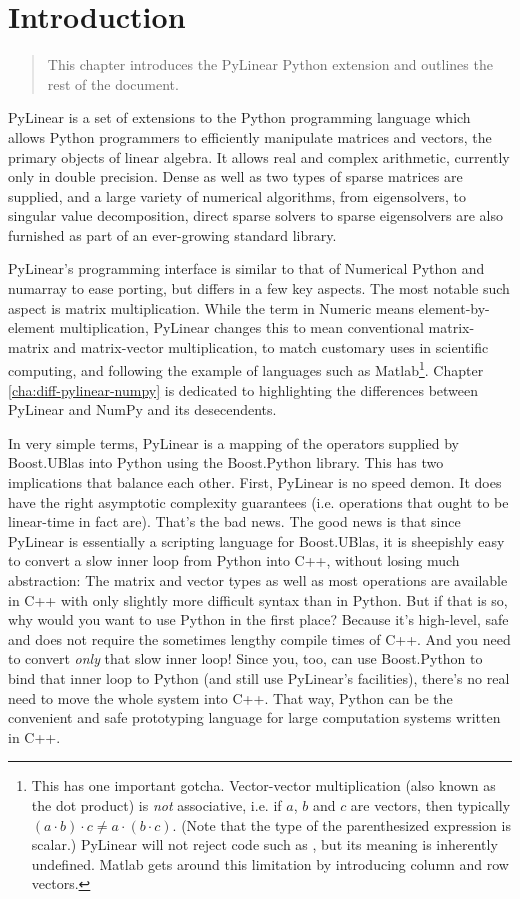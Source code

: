 \chapter{Introduction}
\label{cha:introduction}

\begin{quote}
   This chapter introduces the PyLinear Python extension and outlines the rest
   of the document.
\end{quote}

PyLinear is a set of extensions to the Python programming language
which allows Python programmers to efficiently manipulate matrices and
vectors, the primary objects of linear algebra.  It allows real and
complex arithmetic, currently only in double precision.  Dense as well
as two types of sparse matrices are supplied, and a large variety of
numerical algorithms, from eigensolvers, to singular value
decomposition, direct sparse solvers to sparse eigensolvers are also
furnished as part of an ever-growing standard library.

PyLinear's programming interface is similar to that of Numerical
Python and numarray to ease porting, but differs in a few key
aspects. The most notable such aspect is matrix multiplication. While
the term  in Numeric means element-by-element
multiplication, PyLinear changes this to mean conventional
matrix-matrix and matrix-vector multiplication, to match customary
uses in scientific computing, and following the example of languages
such as Matlab\footnote{This has one important gotcha. Vector-vector
multiplication (also known as the dot product) is \emph{not}
associative, i.e. if $a$, $b$ and $c$ are vectors, then typically
$(a\cdot b)\cdot c\not=a\cdot(b\cdot c)$. (Note that the type of the
parenthesized expression is scalar.) PyLinear will not reject code
such as , but its meaning is inherently undefined. Matlab
gets around this limitation by introducing column and row vectors.}.
Chapter \ref{cha:diff-pylinear-numpy} is dedicated to highlighting the
differences between PyLinear and NumPy and its desecendents.

In very simple terms, PyLinear is a mapping of the operators supplied by
Boost.UBlas into Python using the Boost.Python library.  This has two
implications that balance each other. First, PyLinear is no speed demon. It
does have the right asymptotic complexity guarantees (i.e. operations that
ought to be linear-time in fact are). That's the bad news. The good news is
that since PyLinear is essentially a scripting language for Boost.UBlas, it is
sheepishly easy to convert a slow inner loop from Python into C++, without
losing much abstraction: The matrix and vector types as well as most operations
are available in C++ with only slightly more difficult syntax than in Python.
But if that is so, why would you want to use Python in the first place? Because
it's high-level, safe and does not require the sometimes lengthy compile times
of C++.  And you need to convert \emph{only} that slow inner loop!  Since you,
too, can use Boost.Python to bind that inner loop to Python (and still use
PyLinear's facilities), there's no real need to move the whole system into C++.
That way, Python can be the convenient and safe prototyping language for large
computation systems written in C++.
